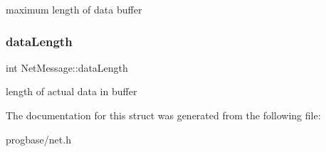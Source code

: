 maximum length of data buffer \mbox{\label{struct_net_message_a17945ca7672211a8721beb04afa1871e}} 
\subsubsection{\texorpdfstring{data\+Length}{dataLength}}
{\footnotesize\ttfamily int Net\+Message\+::data\+Length}

length of actual data in buffer 

The documentation for this struct was generated from the following file\+:\begin{DoxyCompactItemize}
\item 
progbase/net.\+h\end{DoxyCompactItemize}
